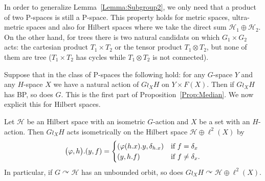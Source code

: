 
























In order to generalize Lemma~\ref{Lemma:Subgroup2}, we only need that a product of two P-spaces is still a P-space.
This property holds for metric spaces, ultra-metric spaces and also for Hilbert spaces where we take the direct sum $\mathcal H_1\oplus\mathcal H_2$.
On the other hand, for trees there is two natural candidats on which $G_1\times G_2$ acts: the cartesian product $T_1\times T_2$ or the tensor product $T_1\otimes T_2$, but none of them are tree ($T_1\times T_2$ has cycles while $T_1\otimes T_2$ is not connected).

Suppose that in the class of P-spaces the following hold: for any $G$-space $Y$ and any $H$-space $X$ we have a natural action of $G\wr_XH$ on $Y\times F(X)$. Then if $G\wr_X H$ has BP, so does $G$. This is the first part of Proposition~\ref{Prop:Median}.
We now explicit this for Hilbert spaces.
\begin{lem}
Let $\mathcal H$ be an Hilbert space with an isometric $G$-action and $X$ be a set with an $H$-action.
Then $G\wr_XH$ acts isometrically on the Hilbert space $\mathcal H\oplus \ell^2(X)$ by
\[
	\bigl(\phi,h\bigr).(y,f)=
	\begin{cases}
	(\phi(h.x).y,\delta_{h.x})&\textnormal{if $f=\delta_x$}\\
	(y,h.f)&\textnormal{if $f\neq\delta_x$.}
	\end{cases}
\]
In particular, if $G\curvearrowright \mathcal H$ has an unbounded orbit, so does $G\wr_XH\curvearrowright\mathcal H\oplus \ell^2(X)$.
\end{lem}

